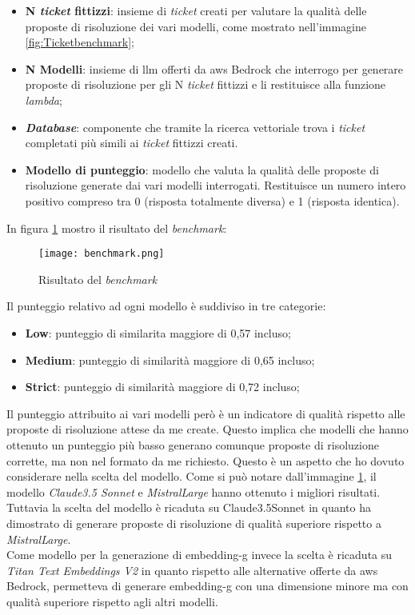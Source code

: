 \begin{itemize}
    \item \textbf{N \textit{ticket} fittizzi}: insieme di \textit{ticket} creati per valutare la qualità delle proposte di risoluzione dei vari modelli, come mostrato nell'immagine \ref{fig:Ticketbenchmark};
    \item \textbf{N Modelli}: insieme di \gls{llm} offerti da \gls{aws} Bedrock che interrogo per generare proposte di risoluzione per gli N \textit{ticket} fittizzi e li restituisce alla funzione \textit{lambda}; 
    \item \textbf{\textit{Database}}: componente che tramite la ricerca vettoriale trova i \textit{ticket} completati più simili ai \textit{ticket} fittizzi creati. 
    \item \textbf{Modello di punteggio}: modello che valuta la qualità delle proposte di risoluzione generate dai vari modelli interrogati. Restituisce un numero intero positivo compreso tra 0 (risposta totalmente diversa) e 1 (risposta identica).
\end{itemize}

In figura \ref{fig:benchmarkResult} mostro il risultato del \textit{benchmark}:
\begin{figure}[H]
    \centering
    \texttt{[image: benchmark.png]}
    \caption{Risultato del \textit{benchmark}}
    \label{fig:benchmarkResult}
\end{figure}
\noindent
Il punteggio relativo ad ogni modello è suddiviso in tre categorie:
\begin{itemize}
    \item \textbf{Low}: punteggio di similarita maggiore di 0,57 incluso;
    \item \textbf{Medium}: punteggio di similarità maggiore di 0,65 incluso;
    \item \textbf{Strict}: punteggio di similarità maggiore di 0,72 incluso;
\end{itemize}
Il punteggio attribuito ai vari modelli però è un indicatore di qualità rispetto alle proposte di risoluzione attese da me create. Questo implica che modelli che hanno ottenuto un punteggio più basso generano comunque proposte di risoluzione corrette, ma non nel formato da me richiesto. Questo è un aspetto che ho dovuto considerare nella scelta del modello.
Come si può notare dall'immagine \ref{fig:benchmarkResult}, il modello \textit{Claude3.5 Sonnet} e \textit{MistralLarge} hanno ottenuto i migliori risultati. Tuttavia la scelta del modello è ricaduta su Claude3.5Sonnet in quanto ha dimostrato di generare proposte di risoluzione di qualità superiore rispetto a \textit{MistralLarge}.\\
Come modello per la generazione di \gls{embedding-g} invece la scelta è ricaduta su \textit{Titan Text Embeddings V2} in quanto rispetto alle alternative offerte da \gls{aws} Bedrock, permetteva di generare \gls{embedding-g} con una dimensione minore ma con qualità superiore rispetto agli altri modelli.

